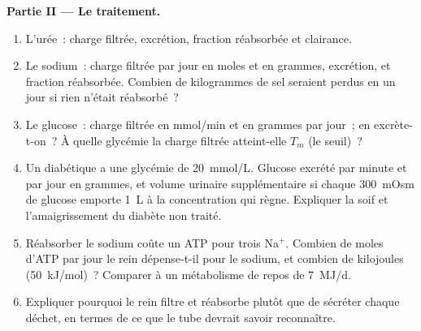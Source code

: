\begin{problem}
\medskip
\noindent\textbf{Partie II --- Le traitement.}
\begin{enumerate}[resume]
  \item L'urée~: charge filtrée, excrétion, fraction réabsorbée et
        clairance.
  \item Le sodium~: charge filtrée par jour en moles et en grammes,
        excrétion, et fraction réabsorbée. Combien de kilogrammes de sel
        seraient perdus en un jour si rien n'était réabsorbé~?
  \item Le glucose~: charge filtrée en mmol/min et en grammes par jour~;
        en excrète-t-on~? À quelle glycémie la charge filtrée
        atteint-elle $T_{m}$ (le seuil)~?
  \item Un diabétique a une glycémie de \qty{20}{mmol/L}. Glucose
        excrété par minute et par jour en grammes, et volume urinaire
        supplémentaire si chaque \qty{300}{mOsm} de glucose emporte
        \qty{1}{L} à la concentration qui règne. Expliquer la soif et
        l'amaigrissement du diabète non traité.
  \item Réabsorber le sodium coûte un ATP pour trois Na$^{+}$. Combien
        de moles d'ATP par jour le rein dépense-t-il pour le sodium, et
        combien de kilojoules (\qty{50}{kJ/mol})~? Comparer à un
        métabolisme de repos de \qty{7}{MJ/d}.
  \item Expliquer pourquoi le rein filtre et réabsorbe plutôt que de
        sécréter chaque déchet, en termes de ce que le tube devrait
        savoir reconnaître.
\end{enumerate}


\end{problem}
